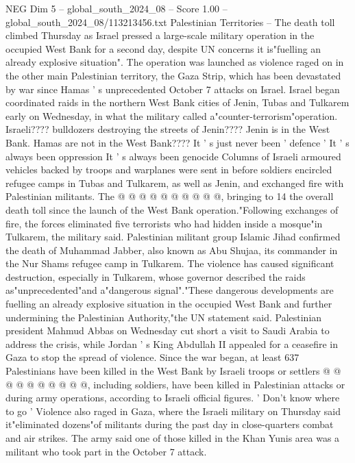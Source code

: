 \begin{textsample}{NEG Dim 5 – global\_south\_2024\_08 – Score 1.00 – global\_south\_2024\_08/113213456.txt}  \label{ex:f5_neg_177}
Palestinian Territories -- The death toll climbed Thursday as Israel pressed a large-scale military operation in the occupied West Bank for a second day, despite UN concerns it is"fuelling an already explosive situation".
The operation was launched as violence raged on in the other main Palestinian territory, the Gaza Strip, which has been devastated by war since Hamas ' s unprecedented October 7 attacks on Israel.
Israel began coordinated raids in the northern West Bank cities of Jenin, Tubas and Tulkarem early on Wednesday, in what the military called a"counter-terrorism"operation.
Israeli???? bulldozers destroying the streets of Jenin????
Jenin is in the West Bank.
Hamas are not in the West Bank????
It ' s just never been ' defence ' It ' s always been oppression It ' s always been genocide Columns of Israeli armoured vehicles backed by troops and warplanes were sent in before soldiers encircled refugee camps in Tubas and Tulkarem, as well as Jenin, and exchanged fire with Palestinian militants.
The @ @ @ @ @ @ @ @ @ @, bringing to 14 the overall death toll since the launch of the West Bank operation."Following exchanges of fire, the forces eliminated five terrorists who had hidden inside a mosque"in Tulkarem, the military said.
Palestinian militant group Islamic Jihad confirmed the death of Muhammad Jabber, also known as Abu Shujaa, its commander in the Nur Shams refugee camp in Tulkarem.
The violence has caused significant destruction, especially in Tulkarem, whose governor described the raids as"unprecedented"and a"dangerous signal"."These dangerous developments are fuelling an already explosive situation in the occupied West Bank and further undermining the Palestinian Authority,"the UN statement said.
Palestinian president Mahmud Abbas on Wednesday cut short a visit to Saudi Arabia to address the crisis, while Jordan ' s King Abdullah II appealed for a ceasefire in Gaza to stop the spread of violence.
Since the war began, at least 637 Palestinians have been killed in the West Bank by Israeli troops or settlers @ @ @ @ @ @ @ @ @ @, including soldiers, have been killed in Palestinian attacks or during army operations, according to Israeli official figures. ' Don't know where to go ' Violence also raged in Gaza, where the Israeli military on Thursday said it"eliminated dozens"of militants during the past day in close-quarters combat and air strikes.
The army said one of those killed in the Khan Yunis area was a militant who took part in the October 7 attack.

\end{textsample}

